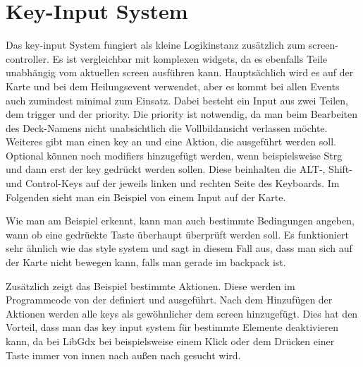 \renewcommand{\kapitelautor}{Autor: Felix Zwickelstorfer}


\section{Key-Input System}\label{sec:key-input-system}
\renewcommand{\kapitelautor}{Autor: Felix Zwickelstorfer}

Das key-input System fungiert als kleine Logikinstanz zusätzlich zum screen-controller.
Es ist vergleichbar mit komplexen widgets, da es ebenfalls Teile unabhängig vom aktuellen screen ausführen kann.
Hauptsächlich wird es auf der Karte und bei dem Heilungsevent verwendet, aber es kommt bei allen Events auch zumindest minimal zum Einsatz.
Dabei besteht ein Input aus zwei Teilen, dem trigger und der priority.
Die priority ist notwendig, da man \zB beim Bearbeiten des Deck-Namens nicht unabsichtlich die Vollbildansicht verlassen möchte.
Weiteres gibt man einen key an und eine Aktion, die ausgeführt werden soll.
Optional können noch modifiers hinzugefügt werden, wenn beispielsweise Strg und dann erst der key gedrückt werden sollen.
Diese beinhalten die ALT-, Shift- und Control-Keys auf der jeweils linken und rechten Seite des Keyboards.
Im Folgenden sieht man ein Beispiel von einem Input auf der Karte.

Wie man am Beispiel erkennt, kann man auch bestimmte Bedingungen angeben, wann \bzw ob eine gedrückte Taste überhaupt überprüft werden soll.
Es funktioniert sehr ähnlich wie das style system und sagt in diesem Fall aus, dass man sich auf der Karte nicht bewegen kann, falls man gerade im backpack ist.

Zusätzlich zeigt das Beispiel bestimmte Aktionen.
Diese werden im Programmcode von der  definiert und ausgeführt.
Nach dem Hinzufügen der Aktionen werden alle keys als gewöhnlicher  dem screen hinzugefügt.
Dies hat den Vorteil, dass man das key input system für bestimmte Elemente deaktivieren kann, da bei LibGdx bei beispielsweise einem Klick oder dem Drücken einer Taste immer von innen nach außen nach  gesucht wird.